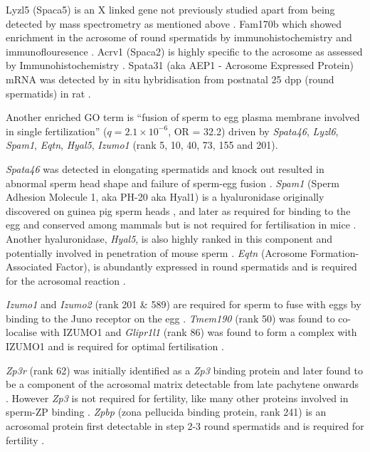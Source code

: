 Lyzl5 (Spaca5) is an X linked gene not previously studied apart from being detected by mass spectrometry as mentioned above \parencite{Guyonnet2012Isolation}. Fam170b which showed enrichment in the acrosome of round spermatids by immunohistochemistry and immunoflouresence \parencite{Li2015FAM170B}. Acrv1 (Spaca2) is highly specific to the acrosome as assessed by Immunohistochemistry \parencite{Osuru2014acrosomal}. Spata31 (aka AEP1 - Acrosome Expressed Protein) mRNA was detected by in situ hybridisation from postnatal 25 dpp (round spermatids) in rat \parencite{Luk2006Acrosomespecific}.
 
Another enriched GO term is ``fusion of sperm to egg plasma membrane involved in single fertilization'' ($q = 2.1\times10^{-6}$, OR = 32.2) driven by \textit{Spata46}, \textit{Lyzl6}, \textit{Spam1}, \textit{Eqtn}, \textit{Hyal5}, \textit{Izumo1} (rank 5, 10, 40, 73, 155 and 201).

\textit{Spata46} was detected in elongating spermatids and knock out resulted in abnormal sperm head shape and failure of sperm-egg fusion \parencite{Chen2016Deficiency}. \textit{Spam1} (Sperm Adhesion Molecule 1, aka PH-20 aka Hyal1) is a hyaluronidase originally discovered on guinea pig sperm heads \parencite{Myles1981Surface}, and later as required for binding to the egg \parencite{Primakoff1985role} and conserved among mammals \parencite{Lathrop1990cDNA} but is not required for fertilisation in mice \parencite{Baba2002Mouse}. Another hyaluronidase, \textit{Hyal5}, is also highly ranked in this component and potentially involved in penetration of mouse sperm \parencite{Kim2005Identification, Kimura2009Functional}. \textit{Eqtn} (Acrosome Formation-Associated Factor), is abundantly expressed in round spermatids and is required for the acrosomal reaction \parencite{Li2006Afaf, Hao2014Equatorin}.

\textit{Izumo1} and \textit{Izumo2} (rank 201 \& 589) are required for sperm to fuse with eggs by binding to the Juno receptor on the egg \parencite{Inoue2005immunoglobulin, Bianchi2014Juno}. \textit{Tmem190} (rank 50) was found to co-localise with IZUMO1 \parencite{Nishimura2011Characterization} and \textit{Glipr1l1} (rank 86) was found to form a complex with IZUMO1 and is required for optimal fertilisation \parencite{Gibbs2010Glioma,Gaikwad2019GLIPR1L1}.

\textit{Zp3r} (rank 62) was initially identified as a \textit{Zp3} binding protein \parencite{Bleil1990Identification} and later found to be a component of the acrosomal matrix detectable from late pachytene onwards \parencite{Kim2001Mouse}. However \textit{Zp3} is not required for fertility, like many other proteins involved in sperm-ZP binding \parencite{Muro2012Function}. \textit{Zpbp} (zona pellucida binding protein, rank 241) is an acrosomal protein first detectable in step 2-3 round spermatids and is required for fertility \parencite{Lin2007Loss}.

